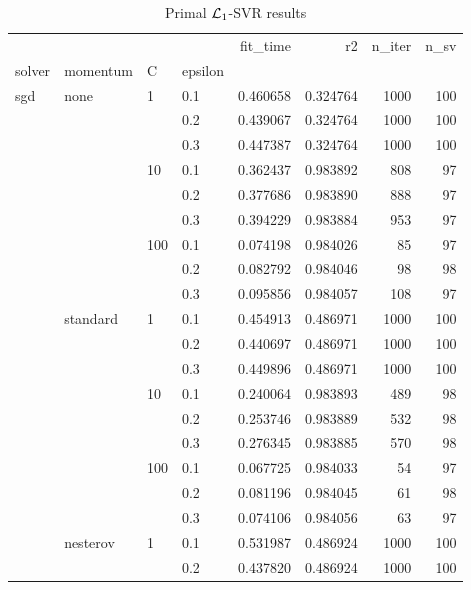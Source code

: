 \begin{table}[H]
\centering
\caption{Primal $\protect \mathcal{L}_1$-SVR results}
\label{primal_l1_svr_cv_results}
\begin{tabular}{llllrrrr}
\toprule
          &   &     &     &  fit\_time &        r2 &  n\_iter &  n\_sv \\
solver & momentum & C & epsilon &           &           &         &       \\
\midrule
sgd & none & 1   & 0.1 &  0.460658 &  0.324764 &    1000 &   100 \\
          &   &     & 0.2 &  0.439067 &  0.324764 &    1000 &   100 \\
          &   &     & 0.3 &  0.447387 &  0.324764 &    1000 &   100 \\
          &   & 10  & 0.1 &  0.362437 &  0.983892 &     808 &    97 \\
          &   &     & 0.2 &  0.377686 &  0.983890 &     888 &    97 \\
          &   &     & 0.3 &  0.394229 &  0.983884 &     953 &    97 \\
          &   & 100 & 0.1 &  0.074198 &  0.984026 &      85 &    97 \\
          &   &     & 0.2 &  0.082792 &  0.984046 &      98 &    98 \\
          &   &     & 0.3 &  0.095856 &  0.984057 &     108 &    97 \\
          & standard & 1   & 0.1 &  0.454913 &  0.486971 &    1000 &   100 \\
          &   &     & 0.2 &  0.440697 &  0.486971 &    1000 &   100 \\
          &   &     & 0.3 &  0.449896 &  0.486971 &    1000 &   100 \\
          &   & 10  & 0.1 &  0.240064 &  0.983893 &     489 &    98 \\
          &   &     & 0.2 &  0.253746 &  0.983889 &     532 &    98 \\
          &   &     & 0.3 &  0.276345 &  0.983885 &     570 &    98 \\
          &   & 100 & 0.1 &  0.067725 &  0.984033 &      54 &    97 \\
          &   &     & 0.2 &  0.081196 &  0.984045 &      61 &    98 \\
          &   &     & 0.3 &  0.074106 &  0.984056 &      63 &    97 \\
          & nesterov & 1   & 0.1 &  0.531987 &  0.486924 &    1000 &   100 \\
          &   &     & 0.2 &  0.437820 &  0.486924 &    1000 &   100 \\

\end{tabular}
\end{table}
